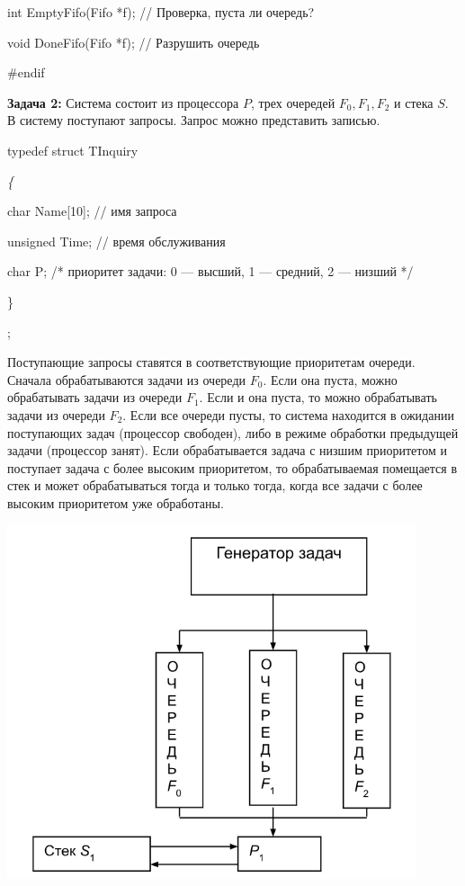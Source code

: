 \documentclass[12pt]{article}
\begin{document}
{{	int  EmptyFifo(Fifo *f); // Проверка, пуста ли очередь?
	
	void DoneFifo(Fifo *f); // Разрушить очередь
	
	\#endif}
	
	{\bf Задача 2:} Система состоит из процессора $P$, трех очередей $F_0,  F_1,  F_2$ и стека $S$. В систему поступают запросы. Запрос можно представить записью.
	
	typedef struct TInquiry
	
	{\it \{  
		
		char Name[10]; // имя запроса
		
		unsigned Time; // время обслуживания
		
		char P; /* приоритет задачи: 0 — высший, 1 — средний, 2 — низший */
		
	\}};	
	
	Поступающие запросы ставятся в соответствующие приоритетам очереди. Сначала обрабатываются задачи из очереди $F_0$. Если она пуста, можно обрабатывать задачи из очереди $F_1$. Если и она пуста, то можно обрабатывать задачи из очереди $F_2$. Если все очереди пусты, то система находится в ожидании поступающих задач (процессор свободен), либо в режиме обработки предыдущей задачи (процессор занят). Если обрабатывается задача с низшим приоритетом и поступает задача с более высоким приоритетом, то обрабатываемая помещается в стек и может обрабатываться тогда и только тогда, когда все задачи с более высоким приоритетом уже обработаны.
	
	\includegraphics[width=120mm]{images/sheme.png}
	
}
\end{document}
